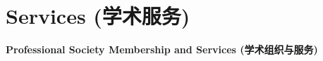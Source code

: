 \documentclass[paper=a4,fontsize=11pt]{scrartcl}
\begin{document}
%
%
%












\section*{Services (学术服务)}

\textbf{Professional Society Membership and Services (学术组织与服务)} 
\end{document}
